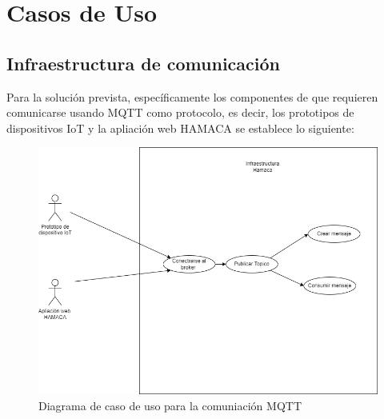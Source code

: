 

\chapter{Casos de Uso}

\section{Infraestructura de comunicación}
Para la solución prevista, específicamente los componentes de que requieren comunicarse usando MQTT como protocolo, es decir, los prototipos de dispositivos IoT y la apliación web HAMACA se establece lo siguiente:

\begin{figure}[htb]
\centering
\includegraphics[scale=0.4]{./Figuras/caso_de_uso_mqtt.png}
\caption{Diagrama de caso de uso para la comuniación MQTT}
\label{fig:caso_de_uso_mqtt}
\vspace*{-10pt}
\end{figure}

